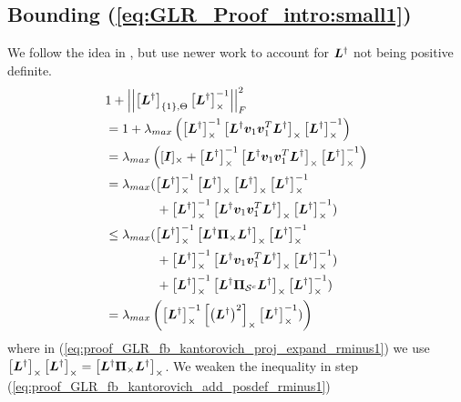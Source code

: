 \subsection{Bounding (\ref{eq:GLR_Proof_intro:small1})}
\label{subapp:GLR_Proof:adjustment_term}
We follow the idea in \cite[Eq. 20-23]{householder1965kantorovich}, but use newer work to account for $\bm{L}^{\dagger}$ not being positive definite.
\begin{align}
    &1 + \sqfrob{\msubgen[\{1\},\Theta]{\matr{L}^{\dagger}}\msub[\Theta]{\matr{L}^{\dagger}}^{-1}} \label{eq:proof_GLR_fb_kantorovich_rminus1_first}\\
    &= 1 + \lambda_{max}\left( \msub[\Theta]{\matr{L}^{\dagger}}^{-1}\msub[\Theta]{\matr{L}^{\dagger}\vect{v}_{1}\vect{v}_{1}^{T}\matr{L}^{\dagger}}\msub[\Theta]{\matr{L}^{\dagger}}^{-1}\right) \\
    &= \lambda_{max}\left(\matrsub[\Theta]{I} + \msub[\Theta]{\matr{L}^{\dagger}}^{-1}\msub[\Theta]{\matr{L}^{\dagger}\vect{v}_{1}\vect{v}_{1}^{T}\matr{L}^{\dagger}}\msub[\Theta]{\matr{L}^{\dagger}}^{-1}\right)\\
    &= \lambda_{max}(\msub[\Theta]{\matr{L}^{\dagger}}^{-1}\msub[\Theta]{\matr{L}^{\dagger}}\msub[\Theta]{\matr{L}^{\dagger}}\msub[\Theta]{\matr{L}^{\dagger}}^{-1}\\
    &\qquad\qquad+ \msub[\Theta]{\matr{L}^{\dagger}}^{-1}\msub[\Theta]{\matr{L}^{\dagger}\vect{v}_{1}\vect{v}_{1}^{T}\matr{L}^{\dagger}}\msub[\Theta]{\matr{L}^{\dagger}}^{-1}) \\
    &\leq \lambda_{max}(\msub[\Theta]{\matr{L}^{\dagger}}^{-1}\msub[\Theta]{\matr{L}^{\dagger}\proj{\Theta}\matr{L}^{\dagger}}\msub[\Theta]{\matr{L}^{\dagger}}^{-1} \label{eq:proof_GLR_fb_kantorovich_proj_expand_rminus1}\\
    &\qquad\qquad+ \msub[\Theta]{\matr{L}^{\dagger}}^{-1}\msub[\Theta]{\matr{L}^{\dagger}\vect{v}_{1}\vect{v}_{1}^{T}\matr{L}^{\dagger}}\msub[\Theta]{\matr{L}^{\dagger}}^{-1}) \\
    &\qquad\qquad+ \msub[\Theta]{\matr{L}^{\dagger}}^{-1}\msub[\Theta]{\matr{L}^{\dagger}\projgen{\set{S}^{c}}\matr{L}^{\dagger}}\msub[\Theta]{\matr{L}^{\dagger}}^{-1}) \label{eq:proof_GLR_fb_kantorovich_add_posdef_rminus1} \\
    &= \lambda_{max}\left(\msub[\Theta]{\matr{L}^{\dagger}}^{-1}\msub[\Theta]{\left(\matr{L}^{\dagger}\right)^{2}}\msub[\Theta]{\matr{L}^{\dagger}}^{-1})\right) \label{eq:proof_GLR_fb_kantorovich_rminus1_last}
\end{align}
where in (\ref{eq:proof_GLR_fb_kantorovich_proj_expand_rminus1}) we use $ \msub[\Theta]{\matr{L}^{\dagger}}\msub[\Theta]{\matr{L}^{\dagger}}= \msub[\Theta]{\matr{L}^{\dagger}\proj{\Theta}\matr{L}^{\dagger}}$. We weaken the inequality in step (\ref{eq:proof_GLR_fb_kantorovich_add_posdef_rminus1}) 
